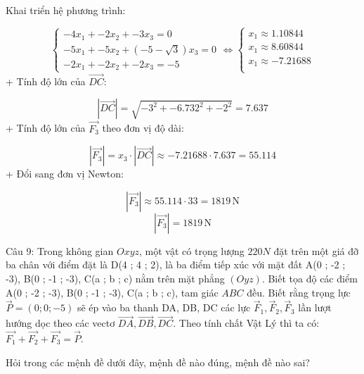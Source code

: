 \documentclass[a4paper,12pt]{article}
\begin{document}
Khai triển hệ phương trình:


\[
\begin{cases}
-4x_1 + -2x_2 + -3x_3 = 0 \\
-5x_1 + -5x_2 + \left(-5 - \sqrt{3}\right)x_3 = 0 \\
-2x_1 + -2x_2 + -2x_3 = -5
\end{cases}
\Leftrightarrow
\begin{cases}
x_1 \approx 1.10844 \\
x_1 \approx 8.60844 \\
x_1 \approx -7.21688 \\
\end{cases}
\]
+ Tính độ lớn của \(\overrightarrow{DC}\):


\[ |\overrightarrow{DC}| = \sqrt{-3^2 + -6.732^2 + -2^2} = 7.637 \]
+ Tính độ lớn của \(\overrightarrow{F_3}\) theo đơn vị độ dài:


\[ |\overrightarrow{F_3}| = x_3 \cdot |\overrightarrow{DC}| \approx -7.21688 \cdot 7.637 = 55.114 \]
+ Đổi sang đơn vị Newton:


\[ |\overrightarrow{F_3}| \approx 55.114 \cdot 33 = 1819\,\mathrm{N} \]
\[|\overrightarrow{F_3}| = 1819\,\mathrm{N}\]



Câu 9: Trong không gian \(Oxyz\), một vật có trọng lượng \(220N\) đặt trên một giá đỡ ba chân với điểm đặt là D(4 ; 4 ; 2), là ba điểm tiếp xúc với mặt đất A(0 ; -2 ; -3), B(0 ; -1 ; -3), C(a ; b ; c) nằm trên mặt phẳng \((O y z )\). Biết tọa độ các điểm A(0 ; -2 ; -3), B(0 ; -1 ; -3), C(a ; b ; c), tam giác \(ABC\) đều. Biết rằng trọng lực \(\overrightarrow{P}=(0 ; 0 ; -5)\) sẽ ép vào ba thanh DA, DB, DC các lực \(\overrightarrow{F}_1, \overrightarrow{F}_2, \overrightarrow{F}_3\) lần lượt hướng dọc theo các vectơ \(\overrightarrow{DA}, \overrightarrow{DB}, \overrightarrow{DC}\). Theo tính chất Vật Lý thì ta có: \(\overrightarrow{F_1}+\overrightarrow{F_2}+\overrightarrow{F_3}=\overrightarrow{P}\).

Hỏi trong các mệnh đề dưới đây, mệnh đề nào đúng, mệnh đề nào sai?
\end{document}
